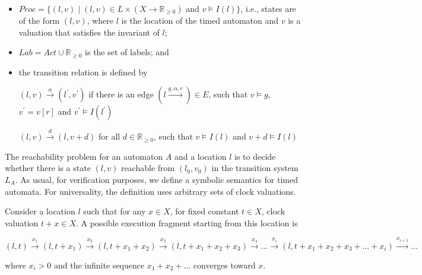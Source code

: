 \begin{itemize}
\item 
$Proc = \lbrace(l,v) \mid (l,v) \in L \times (X \rightarrow \mathbb{R}_{\geqslant{0}})$ and $v \models I(l) \rbrace$, i.e., states are of the form $(l,v)$, where $l$ is the location of the timed automaton and $v$ is a valuation that satisfies the invariant of $l$;
\item
$Lab = Act \cup \mathbb{R}_{\geqslant{0}}$ is the set of labels; and 
\item
the transition relation is defined by 

$(l,v) \xrightarrow{\alpha} (l^{\prime},v^{\prime})$ if there is an edge $(l \xrightarrow{g,\alpha,r}) \in E$, such that $v \models g$, $v^{\prime} = v[r]$ and $v^{\prime} \models I(l^{\prime})$

$(l,v) \xrightarrow{d} (l,v+d)$ for all $d \in  \mathbb{R}_{\geqslant{0}}$, such that $v \models I(l)$ and $v + d \models I(l)$
\end{itemize}
The reachability problem for an automaton $A$ and a location $l$ is to decide whether there is a state $(l,v)$ reachable from $(l_{0},v_{0})$ in the transition system $L_{A}$. As usual, for verification purposes, we define a symbolic semantics for timed automata. For universality, the definition uses arbitrary sets of clock valuations.

Consider a location $l$ such that for any $x \in X$, for fixed constant $t \in X$, clock valuation $t + x \in X$. A possible execution fragment starting from this location is

$(l,t) \xrightarrow{x_{1}} (l,t+x_{1}) \xrightarrow{x_{2}} (l,t+x_{1}+x_{2}) \xrightarrow{x_{3}} (l,t+x_{1}+x_{2}+x_{3}) \xrightarrow{x_{4}}...\xrightarrow{x_{i}}(l,t+x_{1}+x_{2}+x_{3}+...+x_{i}) \xrightarrow{x_{i+1}}...$

where $x_{i} > 0$ and the infinite sequence $x_{1} + x_{2} + . . .$ converges toward $x$. 





